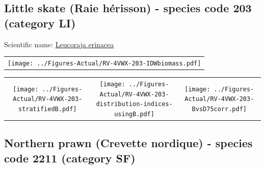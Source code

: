 \documentclass[12pt]{article}\usepackage[]{graphicx}\usepackage[]{color}
\begin{document}
\renewcommand\thefigure{\thesubsection\Alph{figure}}

\setcounter{figure}{0}

\hypertarget{sec:203}{%
\subsection{Little skate (Raie hérisson) - species code 203 (category LI)}\label{sec:203}}

  


Scientific name: \href{http://www.marinespecies.org/aphia.php?p=taxdetails\&id=158551}{Leucoraja erinacea} \newline
\begin{minipage}{1.0\textwidth}
 \begin{tabular}{c}
\texttt{[image: ../Figures-Actual/RV-4VWX-203-IDWbiomass.pdf]} \\ 
\end{tabular} 
\end{minipage}
\newline

\vspace{1cm}
\begin{minipage}{1.0\textwidth}
 \begin{tabular}{ccc}
\texttt{[image: ../Figures-Actual/RV-4VWX-203-stratifiedB.pdf]} & 
\texttt{[image: ../Figures-Actual/RV-4VWX-203-distribution-indices-usingB.pdf]} & 
\texttt{[image: ../Figures-Actual/RV-4VWX-203-BvsD75corr.pdf]} \\ 
\end{tabular} 
\end{minipage}
\clearpage

\renewcommand\thefigure{\thesubsection\Alph{figure}}

\setcounter{figure}{0}

\hypertarget{sec:2211}{%
\subsection{Northern prawn (Crevette nordique) - species code 2211 (category SF)}\label{sec:2211}}

  
\end{document}

